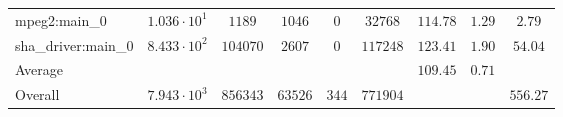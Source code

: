 \begin{tabular}{|l|c|c|c|c|c|c|c|c|}
mpeg2:main\_0           & $ 1.036 \cdot 10^{1} $ & $ 1189   $ & $ 1046  $ & $ 0   $ & $ 32768  $ & $ 114.78      $ & $ 1.29    $ & $ 2.79    $ \\
sha\_driver:main\_0     & $ 8.433 \cdot 10^{2} $ & $ 104070 $ & $ 2607  $ & $ 0   $ & $ 117248 $ & $ 123.41      $ & $ 1.90    $ & $ 54.04   $ \\
\hline
Average                 & $                    $ & $        $ & $       $ & $     $ & $        $ & $ 109.45      $ & $ 0.71    $ & $         $ \\
\hline
Overall                 & $ 7.943 \cdot 10^{3} $ & $ 856343 $ & $ 63526 $ & $ 344 $ & $ 771904 $ & $             $ & $         $ & $ 556.27  $ \\
\hline
\end{tabular}
